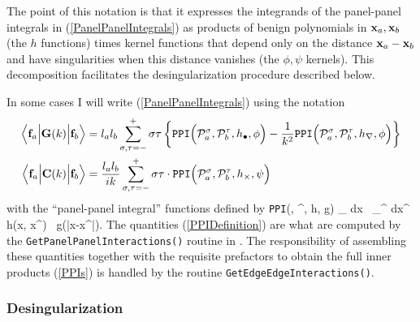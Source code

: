 \documentclass[dvips,letterpaper]{article}
\begin{document}
The point of this notation is that it expresses the 
integrands of the panel-panel integrals in (\ref{PanelPanelIntegrals}) 
as products of benign polynomials in $\mathbf{x}_a, \mathbf{x}_b$
(the $h$ functions) times kernel functions that depend only 
on the distance $\mathbf{x}_a-\mathbf{x}_b$ and have singularities 
when this distance vanishes (the $\phi, \psi$ kernels).
This decomposition facilitates the desingularization procedure
described below.

In some cases I will write (\ref{PanelPanelIntegrals}) 
using the notation
\begin{subequations}
\begin{align}
 \Big\langle \mathbf{f}_a \Big| \mathbf{G}(k) \Big | \mathbf{f}_b \Big \rangle
&=
  l_a l_b 
  \sum_{\sigma, \tau=-}^+ 
  \sigma\tau
  \left\{               \texttt{PPI}\Big(\mathcal{P}_a^\sigma, \mathcal{P}_b^\tau, h_\bullet, \phi\Big) 
         -\frac{1}{k^2} \texttt{PPI}\Big(\mathcal{P}_a^\sigma, \mathcal{P}_b^\tau, h_\nabla,  \phi\Big) 
  \right\}
\\
 \Big\langle \mathbf{f}_a \Big| \mathbf{C}(k) \Big | \mathbf{f}_b \Big \rangle
&=
  \frac{l_a l_b }{ik}
  \sum_{\sigma, \tau=-}^+ \sigma \tau \cdot 
   \texttt{PPI}\Big(\mathcal{P}_a^\sigma, \mathcal{P}_b^\tau, h_\times, \psi\Big) 
\end{align}
\label{PPIs}
\end{subequations}
with the ``panel-panel integral'' functions defined by 
{
   \texttt{PPI}\Big(\pan, \pan^\prime, h, g\Big)
   \equiv 
   \int_{\pan} d\vb x \, 
   \int_{\pan^\prime} d\vb x^\prime \, 
   h(\vb x, \vb x^\prime) \, g(|\vb x-\vb x^\prime|).
}
The quantities (\ref{PPIDefinition}) are what are computed 
by the \texttt{GetPanelPanelInteractions()} routine in \ls. 
The responsibility of assembling these quantities together with
the requisite prefactors to obtain the full inner products
(\ref{PPIs}) is handled by the routine 
\texttt{GetEdgeEdgeInteractions()}.

\subsubsection*{Desingularization}
\end{document}

